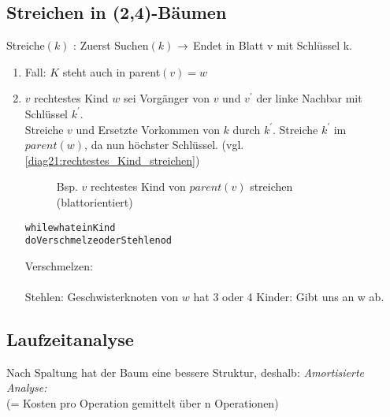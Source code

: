         \subsection{Streichen in (2,4)-Bäumen}
            Streiche$(k)$ : Zuerst Suchen$(k)$ $\rightarrow$ Endet in Blatt v mit Schlüssel k. \\
            \begin{enumerate}[1.]
                \item Fall:  $K$ steht auch in parent$(v) = w$ \\
                
                \item
                $v$ rechtestes Kind $w$ sei Vorgänger von $v$ und $v^{'}$ der linke Nachbar mit Schlüssel $k^{'}$.\\
                Streiche $v$ und Ersetzte Vorkommen von $k$ durch $k^{'}$. Streiche $k^{'}$ im $parent(w)$, da nun höchster Schlüssel. 
                (vgl. \autoref{diag21:rechtestes_Kind_streichen})
                \begin{figure}
                	
                	\caption{Bsp. $v$ rechtestes Kind von $parent(v)$ streichen (blattorientiert)}
                	\label{diag21:rechtestes_Kind_streichen}
                \end{figure}
                \begin{alltt}
                while w hat ein Kind
                do Verschmelze oder Stehlen od
                \end{alltt}
                Verschmelzen: \\
                \\
                Stehlen: Geschwisterknoten von $w$ hat 3 oder 4 Kinder:  Gibt uns an w ab. \\
                
            \end{enumerate}

        \subsection{Laufzeitanalyse}
            Nach Spaltung hat der Baum eine bessere Struktur, deshalb:
            \emph{Amortisierte Analyse:}\\
            (= Kosten pro Operation gemittelt über n Operationen)


